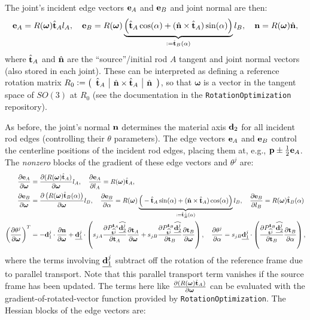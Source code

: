 \documentclass[10pt]{article}
\newcommand{\defeq}{\vcentcolon=}
\providecommand{\cross}{\times}
\providecommand{\pder}[2]{\frac{\partial #1}{\partial #2}}
\renewcommand{\vec}[1]{{\bf #1}}
\def\normal{{\bf n}}
\def\n{\normal}
\def\d{\vec{d}}
\def\t{\vec{t}}
\def\w{\boldsymbol{\omega}}
\def\p{\vec{p}}
\def\e{\vec{e}}
\providecommand\ts[1]{\widehat{\vec{t}^{#1}}}
\providecommand\ds[2]{\widehat{\vec{d}^{#1}_{#2}}}
\providecommand\tsA{\hat{\vec{t}}_A}
\providecommand\tsB{\hat{\vec{t}}_B}
\providecommand\ns{\hat{\vec{n}}}
\begin{document}
The joint's incident edge vectors $\e_A$ and $\e_B$ and joint normal are then:
$$
\e_A = R(\w) \tsA l_A, \quad
\e_B = R(\w) \underbrace{\Big(\tsA \cos(\alpha) + (\ns \cross \tsA) \sin(\alpha)\Big)}_{\defeq \tsB(\alpha)} l_B, \quad
\n = R(\w) \ns,
$$
where $\tsA$ and $\ns$ are the ``source''/initial rod $A$ tangent and joint normal vectors
(also stored in each joint).
These can be interpreted as defining a reference rotation matrix
$R_0 \defeq \left(\begin{array}{c|c|c} \tsA & \ns \cross \tsA & \ns \end{array}\right)$,
so that $\w$ is a vector in the tangent space of $SO(3)$ at $R_0$ (see the
documentation in the \texttt{RotationOptimization} repository).

As before, the joint's normal $\n$ determines the material axis $\d_2$ for all
incident rod edges (controlling their $\theta$ parameters). The edge vectors $\e_A$ and $\e_B$
control the centerline positions of the incident rod edges, placing them at,
e.g., $\p \pm \frac{1}{2} \e_A$.
The \emph{nonzero} blocks of the gradient of these edge vectors and $\theta^j$ are:
\begin{align*}
    \pder{\e_A}{\w} &= \pder{(R(\w) \tsA)}{\w}l_A, \quad
    \pder{\e_A}{l_A}= R(\w) \tsA, \\
    \pder{\e_B}{\w} &= \pder{\left(R(\w) \tsB(\alpha) \right)}{\w} l_B, \quad
    \pder{\e_B}{\alpha} = R(\w) \underbrace{\Big(-\tsA \sin(\alpha) + (\ns \cross \tsA) \cos(\alpha) \Big)}_{\defeq \tsB^\perp(\alpha)} l_B, \quad
    \pder{\e_B}{l_B} = R(\w) \tsB(\alpha) \\
    \left(\pder{\theta^j}{\w}\right)^T &= -\d^j_1 \cdot \pder{\n}{\w}
    + \underline{\d^j_1} \cdot \left(s_{jA} \pder{P_{\ts{j}}^{\t_A} \underline{\ds{j}{2}}}{\t_A} \pder{\t_A}{\w} + s_{jB} \pder{P_{\ts{j}}^{\t_B} \underline{\ds{j}{2}}}{\t_B} \pder{\t_B}{\w} \right),
\quad
    \pder{\theta^j}{\alpha} = s_{jB} \underline{\d^j_1} \cdot \left(\pder{P_{\ts{j}}^{\t_B} \underline{\ds{j}{2}}}{\t_B} \pder{\t_B}{\alpha} \right),
\end{align*}
where the terms involving $\underline{\d^j_1}$ subtract off the rotation of the reference frame due to parallel transport.
Note that this parallel transport term vanishes if the source frame has been updated.
The terms here like $\pder{(R(\w) \tsA)}{\w}$ can be evaluated with the gradient-of-rotated-vector function
provided by \texttt{RotationOptimization}.
The Hessian blocks of the edge vectors are:
\end{document}
